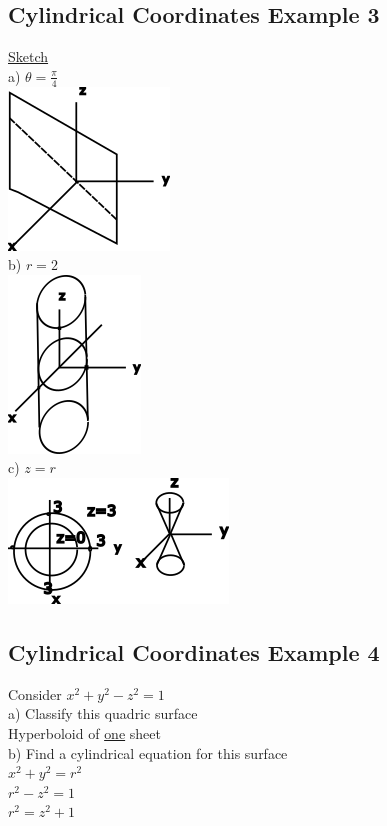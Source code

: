 \documentclass[12pt]{article}
\begin{document}
\subsection{Cylindrical Coordinates Example 3}
\underline{Sketch}\\%
a) $\theta=\frac{\pi}{4}$\\%
\includegraphics{planecylindrical}\\%
b) $r=2$\\%
\includegraphics{cylinderpolar}\\%
c) $z=r$\\%
\includegraphics{conepolar}
\subsection{Cylindrical Coordinates Example 4}
Consider $x^2+y^2-z^2=1$\\%
a) Classify this quadric surface\\%
Hyperboloid of \underline{one} sheet\\%
b) Find a cylindrical equation for this surface\\%
$x^2+y^2=r^2$\\%
$r^2-z^2=1$\\%
$r^2=z^2+1$
\end{document}
